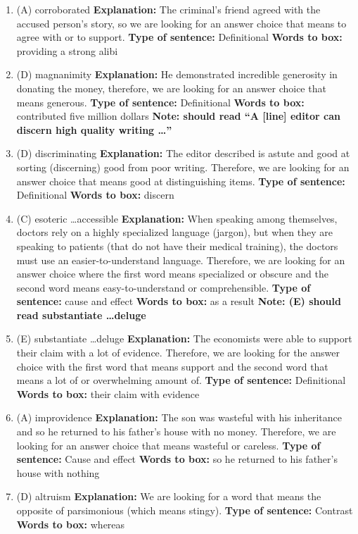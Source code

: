 \begin{enumerate}
\begin{enumerate}
\item (A) corroborated
\textbf{Explanation:} The criminal’s friend agreed with the accused person’s story, so we are looking for an answer choice that means to agree with or to support. 
\textbf{Type of sentence:} Definitional 
\textbf{Words to box:} providing a strong alibi
\item (D) magnanimity 
\textbf{Explanation:} He demonstrated incredible generosity in donating the money, therefore, we are looking for an answer choice that means generous. 
\textbf{Type of sentence:} Definitional
\textbf{Words to box:} contributed five million dollars
\textbf{Note: should read ``A [line] editor can discern high quality writing \ldots''}
\item (D) discriminating 
\textbf{Explanation:} The editor described is astute and good at sorting (discerning) good from poor writing. Therefore, we are looking for an answer choice that means good at distinguishing items. 
\textbf{Type of sentence:} Definitional
\textbf{Words to box:} discern
\item (C) esoteric \ldots accessible
\textbf{Explanation:} When speaking among themselves, doctors rely on a highly specialized language (jargon), but when they are speaking to patients (that do not have their medical training), the doctors must use an easier-to-understand language. Therefore, we are looking for an answer choice where the first word means specialized or obscure and the second word means easy-to-understand or comprehensible. 
\textbf{Type of sentence:} cause and effect
\textbf{Words to box:} as a result
\textbf{Note: (E) should read substantiate \ldots deluge}
\item (E) substantiate \ldots deluge
\textbf{Explanation:} The economists were able to support their claim with a lot of evidence. Therefore, we are looking for the answer choice with the first word that means support and the second word that means a lot of or overwhelming amount of.  
\textbf{Type of sentence:} Definitional
\textbf{Words to box:} their claim with evidence

\item (A) improvidence
\textbf{Explanation:} The son was wasteful with his inheritance and so he returned to his father’s house with no money. Therefore, we are looking for an answer choice that means wasteful or careless. 
\textbf{Type of sentence:} Cause and effect
\textbf{Words to box:} so he returned to his father’s house with nothing
\item (D) altruism
\textbf{Explanation:} We are looking for a word that means the opposite of parsimonious (which means stingy). 
\textbf{Type of sentence:} Contrast
\textbf{Words to box:} whereas 
\end{enumerate}

\end{enumerate}
